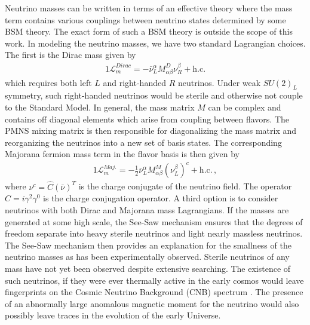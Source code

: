 \documentclass[universe,article,submit,moreauthors,pdftex,a4paper]{Definitions/mdpi}
\begin{document}
Neutrino masses can be written in terms of an effective theory where the mass term contains various couplings between neutrino states determined by some BSM theory. The exact form of such a BSM theory is outside the scope of this work. In modeling the neutrino masses, we have two standard Lagrangian choices. The first is the Dirac mass given by
\begin{alignat}{1}
	\label{DiracMass} \mathcal{L}_{m}^{Dirac} = -\bar{\nu}^{\alpha}_{L}M^{D}_{\alpha\beta}\nu^{\beta}_{R}+\mathrm{h.c.}
\end{alignat}
which requires both left $L$ and right-handed $R$ neutrinos. Under weak $SU(2)_{L}$ symmetry, such right-handed neutrinos would be sterile and otherwise not couple to the Standard Model. In general, the mass matrix $M$ can be complex and contains off diagonal elements which arise from coupling between flavors. The PMNS mixing matrix is then responsible for diagonalizing the mass matrix and reorganizing the neutrinos into a new set of basis states. The corresponding Majorana fermion mass term in the flavor basis is then given by
\begin{alignat}{1}
	\label{Majorana} \mathcal{L}_{m}^{Maj.} = -\frac{1}{2}\bar{\nu}^{\alpha}_{L}M^{M}_{\alpha\beta}(\nu^{\beta}_{L})^{c}+\mathrm{h.c.}\,,
\end{alignat}
where $\nu^{c} = \hat{C}(\bar{\nu})^{T}$ is the charge conjugate of the neutrino field. The operator $\hat{C} = i\gamma^{2}\gamma^{0}$ is the charge conjugation operator. A third option is to consider neutrinos with both Dirac and Majorana mass Lagrangians. If the masses are generated at some high scale, the See-Saw mechanism ensures that the degrees of freedom separate into heavy sterile neutrinos and light nearly massless neutrinos. The See-Saw mechanism then provides an explanation for the smallness of the neutrino masses as has been experimentally observed. Sterile neutrinos of any mass have not yet been observed despite extensive searching. The existence of such neutrinos, if they were ever thermally active in the early cosmos would leave fingerprints on the Cosmic Neutrino Background (CNB) spectrum \cite{Birrell:2014qna}. The presence of an abnormally large anomalous magnetic moment \cite{Morgan:1981zy,Fukugita:1987uy,Vogel:1989iv,Elmfors:1997tt,Giunti:2008ve,Giunti:2014ixa,Canas:2015yoa} for the neutrino would also possibly leave traces in the evolution of the early Universe.
\end{document}
